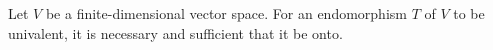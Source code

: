 Let $V$ be a finite-dimensional vector space. For an endomorphism $T$ of $V$ to be univalent, it is necessary and sufficient that it be onto.
